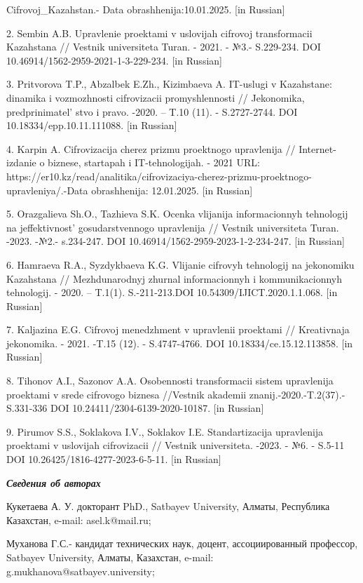 Cifrovoj\_Kazahstan.- Data obrashhenija:10.01.2025. {[}in Russian{]}

2. Sembin A.B. Upravlenie proektami v uslovijah cifrovoj transformacii
Kazahstana // Vestnik universiteta Turan. - 2021. - №3.- S.229-234. DOI
10.46914/1562-2959-2021-1-3-229-234. {[}in Russian{]}

3. Pritvorova T.P., Abzalbek E.Zh., Kizimbaeva A. IT-uslugi v Kazahstane:
dinamika i vozmozhnosti cifrovizacii promyshlennosti // Jekonomika,
predprinimatel' stvo i pravo. -2020. -- T.10 (11). -
S.2727-2744. DOI 10.18334/epp.10.11.111088. {[}in Russian{]}

4. Karpin A. Cifrovizacija cherez prizmu proektnogo upravlenija //
Internet-izdanie o biznese, startapah i IT-tehnologijah. - 2021 URL:
https://er10.kz/read/analitika/cifrovizaciya-cherez-prizmu-proektnogo-upravleniya/.-Data
obrashhenija: 12.01.2025. {[}in Russian{]}

5. Orazgalieva Sh.O., Tazhieva S.K. Ocenka vlijanija informacionnyh
tehnologij na jeffektivnost'{} gosudarstvennogo
upravlenija // Vestnik universiteta Turan. -2023. -№2.- s.234-247. DOI
10.46914/1562-2959-2023-1-2-234-247. {[}in Russian{]}

6. Hamraeva R.A., Syzdykbaeva K.G. Vlijanie cifrovyh tehnologij na
jekonomiku Kazahstana // Mezhdunarodnyj zhurnal informacionnyh i
kommunikacionnyh tehnologij. - 2020. -- T.1(1). S.-211-213.DOI
10.54309/IJICT.2020.1.1.068. {[}in Russian{]}

7. Kaljazina E.G. Cifrovoj menedzhment v upravlenii proektami //
Kreativnaja jekonomika. - 2021. -T.15 (12). - S.4747-4766. DOI
10.18334/ce.15.12.113858. {[}in Russian{]}

8. Tihonov A.I., Sazonov A.A. Osobennosti transformacii sistem
upravlenija proektami v srede cifrovogo biznesa //Vestnik akademii
znanij.-2020.-T.2(37).- S.331-336 DOI 10.24411/2304-6139-2020-10187.
{[}in Russian{]}

9. Pirumov S.S., Soklakova I.V., Soklakov I.E. Standartizacija
upravlenija proektami v uslovijah cifrovizacii // Vestnik universiteta.
-2023. - №6. - S.5-11 DOI 10.26425/1816-4277-2023-6-5-11. {[}in
Russian{]}

\emph{{\bfseries Сведения об авторах}}

Кукетаева А. У. докторант PhD., Satbayev University, Алматы, Республика
Казахстан, e-mail: asel.k@mail.ru;

Муханова Г.С.- кандидат технических наук, доцент, ассоциированный
профессор, Satbayev University, Алматы, Казахстан, e-mail:
g.mukhanova@satbayev.university;

